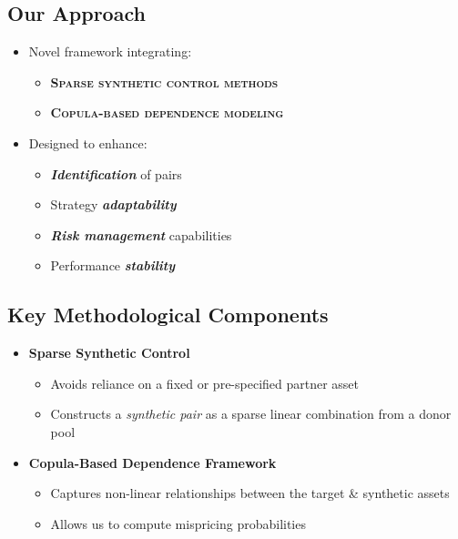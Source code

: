 \documentclass[
  letterpaper,
  DIV=11,
  numbers=noendperiod]{scrartcl}
\providecommand{\tightlist}{%
  \setlength{\itemsep}{0pt}\setlength{\parskip}{0pt}}\usepackage{longtable,booktabs,array}
\begin{document}
\subsection{Our Approach}\label{our-approach}

\begin{itemize}
\tightlist
\item
  Novel framework integrating:

  \begin{itemize}
  \tightlist
  \item
    \textsc{\textbf{Sparse synthetic control methods}}
  \item
    \textsc{\textbf{Copula-based dependence modeling}}
  \end{itemize}
\end{itemize}

\begin{itemize}
\tightlist
\item
  Designed to enhance:

  \begin{itemize}
  \tightlist
  \item
    \textbf{\emph{Identification}} of pairs
  \item
    Strategy \textbf{\emph{adaptability}}
  \item
    \textbf{\emph{Risk management}} capabilities
  \item
    Performance \textbf{\emph{stability}}
  \end{itemize}
\end{itemize}

\subsection{Key Methodological
Components}\label{key-methodological-components}

\begin{itemize}
\tightlist
\item
  \textbf{Sparse Synthetic Control}

  \begin{itemize}
  \tightlist
  \item
    Avoids reliance on a fixed or pre-specified partner asset
  \item
    Constructs a \emph{synthetic pair} as a sparse linear combination
    from a donor pool
  \end{itemize}
\end{itemize}

\begin{itemize}
\tightlist
\item
  \textbf{Copula-Based Dependence Framework}

  \begin{itemize}
  \tightlist
  \item
    Captures non-linear relationships between the target \& synthetic
    assets
  \item
    Allows us to compute mispricing probabilities
  \end{itemize}
\end{itemize}
\end{document}
